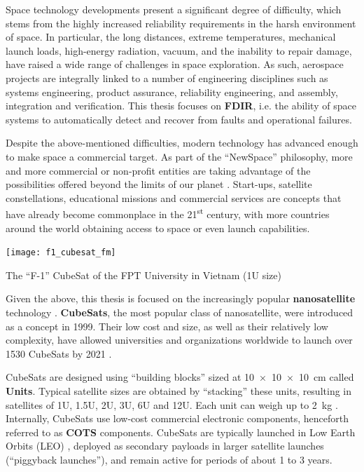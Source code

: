 \documentclass[a4paper,nobib]{tufte-book}
\def\acusepage#1{}
\begin{document}
Space technology developments present a significant degree of difficulty, which stems from the highly increased reliability requirements in the harsh environment of space. In particular, the long distances, extreme temperatures, mechanical launch loads, high-energy radiation, vacuum, and the inability to repair damage, have raised a wide range of challenges in space exploration. As such, aerospace projects are integrally linked to a number of engineering disciplines such as systems engineering, product assurance, reliability engineering, and assembly, integration and verification. This thesis focuses on \textbf{\acf{FDIR}}, i.e. the ability of space systems to automatically detect and recover from faults and operational failures.%
	
Despite the above-mentioned difficulties, modern technology has advanced enough to make space a commercial target. As part of the ``NewSpace'' philosophy, more and more commercial or non-profit entities are taking advantage of the possibilities offered beyond the limits of our planet \autocite{denis_new_space_2020}. Start-ups, satellite constellations, educational missions and commercial services are concepts that have already become commonplace in the 21\textsuperscript{st} century, with more countries around the world obtaining access to space or even launch capabilities.
	
\begin{marginfigure}
	\texttt{[image: f1\_cubesat\_fm]}
	\caption{The ``F-1'' CubeSat of the FPT University in Vietnam (1U size)}
	\label{fig:cubesat}
\end{marginfigure}

Given the above, this thesis is focused on the increasingly popular \textbf{nanosatellite} technology \autocite{sweeting_modern_small_2018a}. \textbf{CubeSats}, the most popular class of nanosatellite, were introduced as a concept in 1999. Their low cost and size, as well as their relatively low complexity, have allowed universities and organizations worldwide to launch over \SI{1530}{} CubeSats by 2021 \autocite{swartwout_cubesat_database_2021}.
	
CubeSats are designed using ``building blocks'' sized at \SI[product-units = single]{10 x 10 x 10}{\centi\metre} called \textbf{Units}. Typical satellite sizes are obtained by ``stacking'' these units, resulting in satellites of 1U, 1.5U, 2U, 3U, 6U and 12U. Each unit can weigh up to \SI{2}{\kilogram} \autocite{CDS14}. Internally,  CubeSats use low-cost commercial electronic components, henceforth referred to as \textbf{\acf{COTS}} components. CubeSats are typically launched in Low Earth Orbits (\acs{LEO}) \autocite{anthopoulos_orbital_analysis_2020,riebeek_catalog_earth_2009}, deployed as secondary payloads in larger satellite launches (``piggyback launches''), and remain active for periods of about 1 to 3 years.
\end{document}
